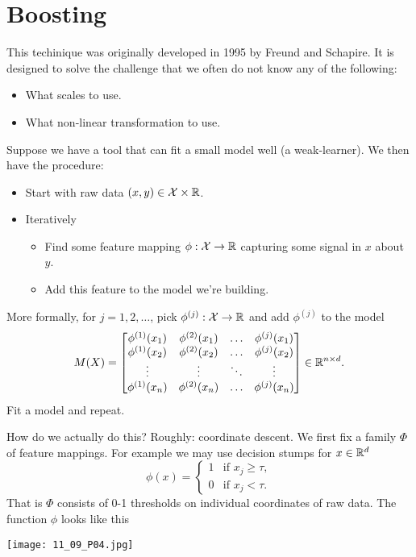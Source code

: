 \section{Boosting}
This techinique was originally developed in 1995 by Freund and Schapire. It is designed to solve the challenge that we often do not know any of the following:
\begin{itemize}
    \item What scales to use.
    \item What non-linear transformation to use.
\end{itemize}
Suppose we have a tool that can fit a small model well (a weak-learner). We then have the procedure:
\begin{itemize}
    \item Start with raw data $(x,y) \in {\mathcal{X}} \times {\mathbb R}$.
    \item Iteratively\begin{itemize}
        \item Find some feature mapping $\phi : {\mathcal{X}} \to {\mathbb R}$ capturing some signal in $x$ about $y$.
        \item Add this feature to the model we're building.
    \end{itemize}
\end{itemize}
More formally, for $j=1,2,\ldots$, pick $\phi^{(j)} : {\mathcal{X}} \to {\mathbb R}$ and add $\phi^{(j)}$ to the model
\[M(X) = \begin{bmatrix}
    \phi^{(1)}(x_1)&\phi^{(2)}(x_1)&\ldots & \phi^{(j)}(x_1)\\
    \phi^{(1)}(x_2)&\phi^{(2)}(x_2)&\ldots & \phi^{(j)}(x_2)\\
    \vdots & \vdots & \ddots & \vdots \\
    \phi^{(1)}(x_n)&\phi^{(2)}(x_n)&\ldots & \phi^{(j)}(x_n) 
\end{bmatrix}\in {\mathbb R}^{n \times d}. \]
Fit a model and repeat. 

How do  we actually do this? Roughly: coordinate descent. We first fix a family $\Phi$ of feature mappings. For example we may use decision stumps for $x \in {\mathbb R}^d$
\[\phi(x) = \begin{cases}
    1 & \text{if } x_j \ge \tau,\\
    0 & \text{if } x_j < \tau.
\end{cases} \]
That is $\Phi$ consists of 0-1 thresholds on individual coordinates of raw data. The function $\phi$ looks like this

\begin{center}
    \texttt{[image: 11\_09\_P04.jpg]}
\end{center}

